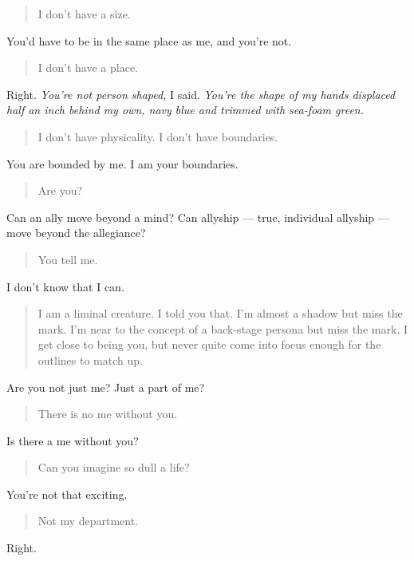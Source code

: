 \begin{quote}
I don't have a size.
\end{quote}

You'd have to be in the same place as me, and you're not.

\begin{quote}
I don't have a place.
\end{quote}

Right. \emph{You're not person shaped,} I said. \emph{You're the shape of my hands displaced half an inch behind my own, navy blue and trimmed with sea-foam green.}

\begin{quote}
I don't have physicality. I don't have boundaries.
\end{quote}

You are bounded by me. I am your boundaries.

\begin{quote}
Are you?
\end{quote}

Can an ally move beyond a mind? Can allyship --- true, individual allyship --- move beyond the allegiance?

\begin{quote}
You tell me.
\end{quote}

I don't know that I can.

\begin{quote}
I am a liminal creature. I told you that. I'm almost a shadow but miss the mark. I'm near to the concept of a back-stage persona but miss the mark. I get close to being you, but never quite come into focus enough for the outlines to match up.
\end{quote}

Are you not just me? Just a part of me?

\begin{quote}
There is no me without you.
\end{quote}

Is there a me without you?

\begin{quote}
Can you imagine so dull a life?
\end{quote}

You're not that exciting.

\begin{quote}
Not my department.
\end{quote}

Right.

